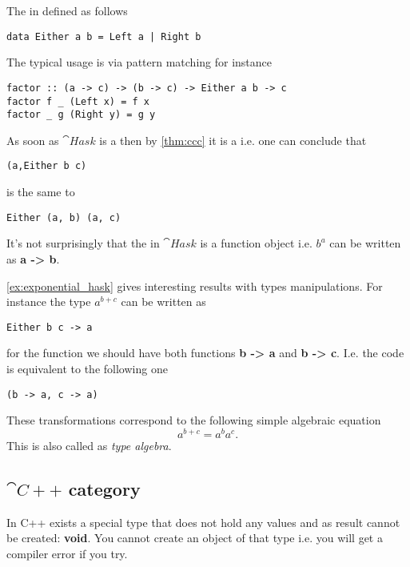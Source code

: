 \begin{example}
\label{ex:hask_sum}
The  in  defined as
follows 
\begin{verbatim}
data Either a b = Left a | Right b
\end{verbatim}

The typical usage is via pattern matching for instance 
\begin{verbatim}
factor :: (a -> c) -> (b -> c) -> Either a b -> c
factor f _ (Left x) = f x
factor _ g (Right y) = g y
\end{verbatim}
\end{example}

\begin{example}
As soon as $\cat{Hask}$ is a 
then by \cref{thm:ccc} it is a 
i.e. one can conclude that
\begin{verbatim}
(a,Either b c)
\end{verbatim}
is the same to
\begin{verbatim}
Either (a, b) (a, c)
\end{verbatim}
\end{example}

\begin{example}
\label{ex:exponential_hask}
It's not surprisingly that the  in
$\cat{Hask}$ is a function object i.e. $b^a$ can be written as  
\textbf{a -> b}.
\end{example}

\begin{example}
\cref{ex:exponential_hask} gives interesting results with types
manipulations. For instance the type $a^{b+c}$ can be written as
\begin{verbatim}
Either b c -> a
\end{verbatim}
for the function we should have both functions 
\textbf{b -> a} and \textbf{b -> c}. I.e.
the code is equivalent to the following one
\begin{verbatim}
(b -> a, c -> a)
\end{verbatim}
These transformations correspond to the following simple algebraic
equation 
\[
a^{b+c} = a^b a^c.
\]
This is also called as \textit{type algebra}.
\end{example}

\subsection{$\cat{C++}$ category}
\begin{example}
\label{ex:cpp_initial_object}
In C++ exists a special type that does not hold any values and as
result cannot be created: \textbf{void}.
You cannot create an object of that type i.e. you will get a compiler
error if you try.
\end{example}

